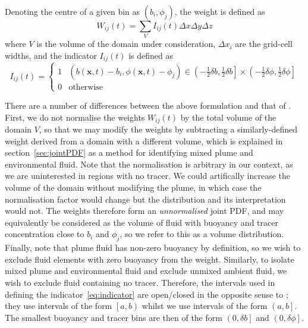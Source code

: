 \documentclass[a4paper]{article}
\begin{document}
Denoting the centre of a given bin as $(b_i, \phi_j)$, the weight is defined as
\begin{equation}
	W_{ij}(t) = \sum_V I_{ij}(t) \Delta x \Delta y \Delta z
\end{equation}
where $V$ is the volume of the domain under consideration, $\Delta x_i$ are the grid-cell widths, and the
indicator $I_{ij}(t)$ is defined as
\begin{equation}
	I_{ij}(t) = \begin{cases}
		1 & \left(b(\bm{x},t) - b_i, \phi(\bm{x},t) - \phi_j\right) \in \left( -\frac{1}{2}\delta b,
		\frac{1}{2}\delta b \right] \times \left( -\frac{1}{2}\delta \phi, \frac{1}{2}\delta \phi \right] \\
			0 & \text{otherwise}
		\end{cases}
		\label{eq:indicator}
\end{equation}

There are a number of differences between the above formulation and that of \citet{penney2020}. First, we do
not normalise the weights $W_{ij}(t)$ by the total volume of the domain $V$, so that we may modify the weights
by subtracting a similarly-defined weight derived from a domain with a different volume, which is explained in
section~\ref{sec:jointPDF} as a method for identifying mixed plume and environmental fluid. Note that the
normalisation is arbitrary in our context, as we are uninterested in regions with no tracer. We could
artifically increase the volume of the domain without modifying the plume, in which case the normalisation
factor would change but the distribution and its interpretation would not. The weights therefore form an
\emph{unnormalised} joint PDF, and may equivalently be considered as the volume of fluid with buoyancy and
tracer concentration close to $b_i$ and $\phi_j$, so we refer to this as a volume distribution. Finally, note
that plume fluid has non-zero buoyancy by definition, so we wish to exclude fluid elements with zero buoyancy
from the weight. Similarly, to isolate mixed plume and environmental fluid and exclude unmixed ambient fluid,
we wish to exclude fluid containing no tracer. Therefore, the intervals used in defining the
indicator~\eqref{eq:indicator} are open/closed in the opposite sense to \citet{penney2020}; they use intervals
of the form $\left[a, b\right)$ whilst we use intervals of the form $\left(a, b\right]$. The smallest buoyancy
and tracer bins are then of the form $\left(0, \delta b\right]$ and $\left(0, \delta \phi\right]$. 
\end{document}
